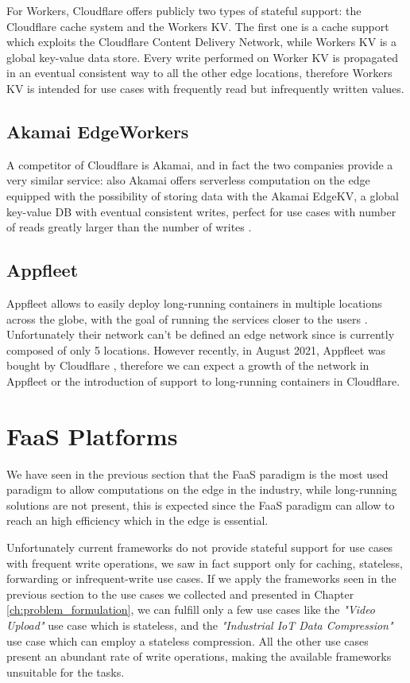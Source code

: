 For Workers, Cloudflare offers publicly two types of stateful support: the Cloudflare cache system and the Workers KV. The first one is a cache support which exploits the Cloudflare Content Delivery Network, while Workers KV is a global key-value data store. Every write performed on Worker KV is propagated in an eventual consistent way to all the other edge locations, therefore Workers KV is intended for use cases with frequently read but infrequently written values.


\subsection{Akamai EdgeWorkers}
A competitor of Cloudflare is Akamai, and in fact the two companies provide a very similar service: also Akamai offers serverless computation on the edge equipped with the possibility of storing data with the Akamai EdgeKV, a global key-value DB with eventual consistent writes, perfect for use cases with number of reads greatly larger than the number of writes \cite{akamai-edge-workers}.


\subsection{Appfleet}
Appfleet allows to easily deploy long-running containers in multiple locations across the globe, with the goal of running the services closer to the users \cite{appfleet}. Unfortunately their network can't be defined an edge network since is currently composed of only 5 locations. However recently, in August 2021, Appfleet was bought by Cloudflare \cite{appfleet-cloudflare}, therefore we can expect a growth of the network in Appfleet or the introduction of support to long-running containers in Cloudflare.


\section{FaaS Platforms}
We have seen in the previous section that the FaaS paradigm is the most used paradigm to allow computations on the edge in the industry, while long-running solutions are not present, this is expected since the FaaS paradigm can allow to reach an high efficiency which in the edge is essential.

Unfortunately current frameworks do not provide stateful support for use cases with frequent write operations, we saw in fact support only for caching, stateless, forwarding or infrequent-write use cases.
If we apply the frameworks seen in the previous section to the use cases we collected and presented in Chapter \ref{ch:problem_formulation}, we can fulfill only a few use cases like the \textit{"Video Upload"} use case which is stateless, and the \textit{"Industrial IoT Data Compression"} use case which can employ a stateless compression. All the other use cases present an abundant rate of write operations, making the available frameworks unsuitable for the tasks.

